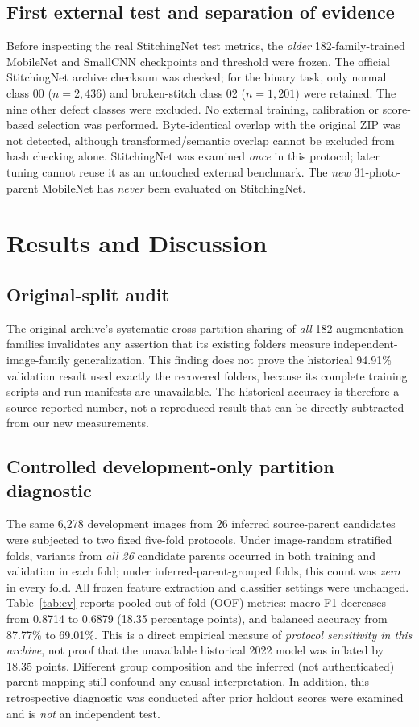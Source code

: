 \documentclass[conference,a4paper]{IEEEtran}
\begin{document}
\subsection{First external test and separation of evidence}
Before inspecting the real StitchingNet test metrics, the \emph{older} 182-family-trained MobileNet and SmallCNN checkpoints and threshold were frozen. The official StitchingNet archive checksum was checked; for the binary task, only normal class 00 ($n=2{,}436$) and broken-stitch class 02 ($n=1{,}201$) were retained. The nine other defect classes were excluded. No external training, calibration or score-based selection was performed. Byte-identical overlap with the original ZIP was not detected, although transformed/semantic overlap cannot be excluded from hash checking alone. StitchingNet was examined \emph{once} in this protocol; later tuning cannot reuse it as an untouched external benchmark. The \emph{new} 31-photo-parent MobileNet has \emph{never} been evaluated on StitchingNet.

\section{Results and Discussion}
\subsection{Original-split audit}
The original archive's systematic cross-partition sharing of \emph{all} 182 augmentation families invalidates any assertion that its existing folders measure independent-image-family generalization. This finding does not prove the historical 94.91\% validation result used exactly the recovered folders, because its complete training scripts and run manifests are unavailable. The historical accuracy is therefore a source-reported number, not a reproduced result that can be directly subtracted from our new measurements.

\subsection{Controlled development-only partition diagnostic}
The same 6,278 development images from 26 inferred source-parent candidates were subjected to two fixed five-fold protocols. Under image-random stratified folds, variants from \emph{all 26} candidate parents occurred in both training and validation in each fold; under inferred-parent-grouped folds, this count was \emph{zero} in every fold. All frozen feature extraction and classifier settings were unchanged. Table~\ref{tab:cv} reports pooled out-of-fold (OOF) metrics: macro-F1 decreases from 0.8714 to 0.6879 (18.35 percentage points), and balanced accuracy from 87.77\% to 69.01\%. This is a direct empirical measure of \emph{protocol sensitivity in this archive}, not proof that the unavailable historical 2022 model was inflated by 18.35 points. Different group composition and the inferred (not authenticated) parent mapping still confound any causal interpretation. In addition, this retrospective diagnostic was conducted after prior holdout scores were examined and is \emph{not} an independent test.
\end{document}
